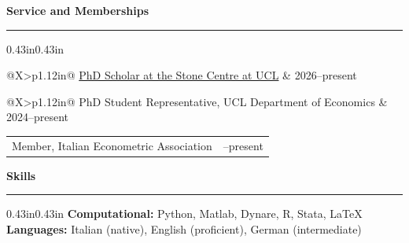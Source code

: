 \documentclass[10pt,a4paper]{article}
\makeatletter
\newenvironment{cvbody}
  {\begin{adjustwidth}{0.43in}{0.43in}}
  {\end{adjustwidth}}
\newcommand{\cvsection}[1]{%
  \vspace{9pt}%
  {\large\bfseries #1}\par
  \vspace{3pt}\hrule\vspace{5pt}%
}
\newcommand{\datedline}[2]{%
  \begin{tabularx}{\linewidth}{@{}X>{\raggedleft\arraybackslash}p{1.12in}@{}}
    #1 & #2
  \end{tabularx}\par
}
\makeatother
\begin{document}
\cvsection{Service and Memberships}
\vspace{4pt}
\begin{cvbody}
  \datedline{\href{https://www.stone-econ.org/}{PhD Scholar at the Stone Centre at UCL}}{2026--present}
  \datedline{PhD Student Representative, UCL Department of Economics}{2024--present}
   \datedline{Member, Italian Econometric Association}{2019--present}
\end{cvbody}

\cvsection{Skills}
\vspace{4pt}
\begin{cvbody}
  \textbf{Computational:} Python, Matlab, Dynare, R, Stata, \LaTeX\\
  \textbf{Languages:} Italian (native), English (proficient), German (intermediate)
\end{cvbody}
\end{document}
